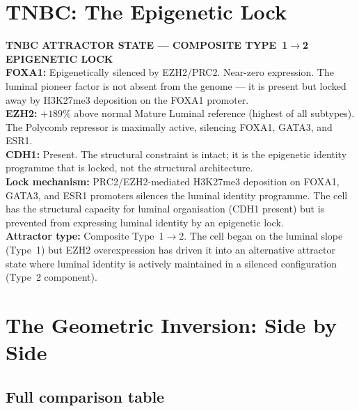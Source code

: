 \documentclass[12pt, a4paper]{article}
\begin{document}
\section{TNBC: The Epigenetic Lock}

\begin{center}
\colorbox{tnbcbox}{
\begin{minipage}{0.88\textwidth}
\vspace{0.5em}
\textbf{TNBC ATTRACTOR STATE --- COMPOSITE
TYPE~1$\rightarrow$2 EPIGENETIC LOCK}\\[0.4em]
\textbf{FOXA1:} Epigenetically silenced by
EZH2/PRC2. Near-zero expression. The luminal
pioneer factor is not absent from the genome ---
it is present but locked away by H3K27me3
deposition on the FOXA1 promoter.\\[0.3em]
\textbf{EZH2:} $+189\%$ above normal Mature
Luminal reference (highest of all subtypes).
The Polycomb repressor is maximally active,
silencing FOXA1, GATA3, and ESR1.\\[0.3em]
\textbf{CDH1:} Present. The structural
constraint is intact; it is the epigenetic
identity programme that is locked, not the
structural architecture.\\[0.3em]
\textbf{Lock mechanism:} PRC2/EZH2-mediated
H3K27me3 deposition on FOXA1, GATA3, and
ESR1 promoters silences the luminal identity
programme. The cell has the structural capacity
for luminal organisation (CDH1 present) but
is prevented from expressing luminal identity
by an epigenetic lock.\\[0.3em]
\textbf{Attractor type:} Composite
Type~1$\rightarrow$2. The cell began
on the luminal slope (Type~1) but EZH2
overexpression has driven it into an
alternative attractor state where luminal
identity is actively maintained in a silenced
configuration (Type~2 component).
\vspace{0.5em}
\end{minipage}}
\end{center}

\section{The Geometric Inversion: Side by Side}

\subsection{Full comparison table}
\end{document}
